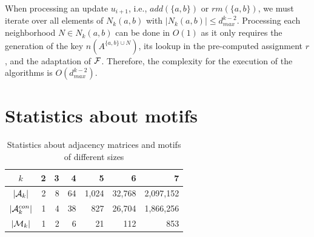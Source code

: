 \documentclass{article}
\newcommand{\imgs}[8]{
	\begin{figure}[!tbh]
		\begin{minipage}[b]{#4\textwidth}
			\centering
			\texttt{[image: \#1]}
			\caption{#3}
			\label{#2}
		\end{minipage}
		\hfill
		\begin{minipage}[b]{#8\textwidth}
			\centering
			\texttt{[image: \#5]}
			\caption{#7}
			\label{#6}
		\end{minipage}
	\end{figure}
}
\begin{document}
When processing an update $u_{i+1}$, i.e., $add(\{a,b\})$ or $rm(\{a,b\})$, we must iterate over all elements of $N_k(a,b)$ with $|N_k(a,b)| \leq d_{max}^{k-2}$.
Processing each neighborhood $N \in N_k(a,b)$ can be done in $O(1)$ as it only requires the generation of the key $n(A^{\{a,b\} \cup N})$, its lookup in the pre-computed assignment $r$, and the adaptation of ${\cal F}$.
Therefore, the complexity for the execution of the algorithms is $O(d_{max}^{k-2})$.








\section{Statistics about motifs}

\begin{table}[!h]
\centering
\begin{tabular}{c rrr rrr}
\toprule
$k$						& 2		& 3		& 4		& 5		& 6			& 7 \\
\midrule
$|{\cal A}_k|$			& 2		& 8		& 64	& 1,024	& 32,768	& 2,097,152 \\
$|{\cal A}_k^{con}|$ 	& 1		& 4		& 38	& 827	& 26,704	& 1,866,256 \\
$|{\cal M}_k|$			& 1		& 2		& 6		& 21	& 112		& 853 \\
\bottomrule
\end{tabular}
\caption{Statistics about adjacency matrices and motifs of different sizes}
\end{table}


\end{document}
